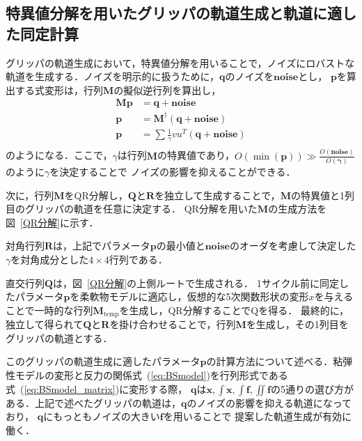 \documentclass[a4paper]{jarticle}
\begin{document}
\subsection{特異値分解を用いたグリッパの軌道生成と軌道に適した同定計算}\label{subsec:QR_traj_and_calculation}
グリッパの軌道生成において，特異値分解を用いることで，ノイズにロバストな軌道を生成する．ノイズを明示的に扱うために，$\mathbf{q}$のノイズを$\mathbf{noise}$とし，
$\mathbf{p}$を算出する式変形は，行列$\mathbf{M}$の擬似逆行列を算出し，
\begin{equation}
    \begin{aligned}
    \mathbf{M}\mathbf{p} &= \mathbf{q} + \mathbf{noise}\\
              \mathbf{p} &= \mathbf{M}^{\dagger}(\mathbf{q} + \mathbf{noise})\\ 
              \mathbf{p} &= \sum \frac{1}{\gamma}vu^T(\mathbf{q}+\mathbf{noise})\\
    \end{aligned}     
\end{equation}
のようになる．ここで，$\gamma$は行列$\mathbf{M}$の特異値であり，$O(\min({\mathbf{p}}))\gg\frac{O(\mathbf{noise})}{O(\mathbf{\gamma})}$のように$\gamma$を決定することで
ノイズの影響を抑えることができる．

次に，行列$\mathbf{M}$をQR分解し，$\mathbf{Q}$と$\mathbf{R}$を独立して生成することで，$\mathbf{M}$の特異値と1列目のグリッパの軌道を任意に決定する．
QR分解を用いた$\mathbf{M}$の生成方法を図~\ref{QR分解}に示す．

対角行列$\mathbf{R}$は，上記でパラメータ$\mathbf{p}$の最小値と$\mathbf{noise}$のオーダを考慮して決定した$\gamma$を対角成分とした$4\times4$行列である．

直交行列$\mathbf{Q}$は，図~\ref{QR分解}の上側ルートで生成される．
1サイクル前に同定したパラメータ$\mathbf{p}$を柔軟物モデルに適応し，仮想的な5次関数形状の変形$x$を与えることで一時的な行列$\mathbf{M}_{\mathrm{temp}}$を生成し，QR分解することでQを得る．
最終的に，独立して得られて$\mathbf{Q}$と$\mathbf{R}$を掛け合わせることで，行列$\mathbf{M}$を生成し，その1列目をグリッパの軌道とする．

このグリッパの軌道生成に適したパラメータ$\mathbf{p}$の計算方法について述べる．粘弾性モデルの変形と反力の関係式~(\ref{eq:BSmodel})を行列形式である式~(\ref{eq:BSmodel_matrix})に変形する際，
$\mathbf{q}$は$\boldsymbol{x} , \int{\boldsymbol{x}} , \int{\boldsymbol{f}} , \iint{\boldsymbol{f}}$の5通りの選び方がある．上記で述べたグリッパの軌道は，$\mathbf{q}$のノイズの影響を抑える軌道になっており，
$\mathbf{q}$にもっともノイズの大きい$\boldsymbol{f}$を用いることで
提案した軌道生成が有効に働く．
\end{document}
